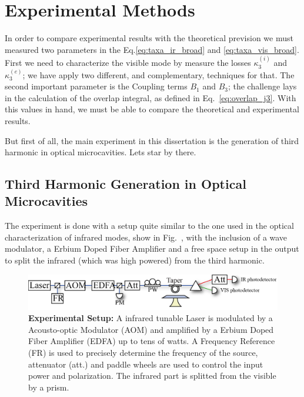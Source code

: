\chapter{Experimental Methods}
\label{chap:6_experiments}
In order to compare experimental results with the theoretical prevision we must measured two parameters in the Eq.\ref{eq:taxa_ir_broad} and \ref{eq:taxa_vis_broad}. First we need to characterize the visible mode by measure the losses $\kappa^{(i)}_3$ and $\kappa^{(e)}_3$; we have apply two different, and complementary, techniques for that. The second important parameter is the Coupling terms $B_1$ and $B_3$; the challenge lays in the calculation of the overlap integral, as defined in Eq.~\ref{eq:overlap_j3}. With this values in hand, we must be able to compare the theoretical and experimental results. 

But first of all, the main experiment in this dissertation is the generation of third harmonic in optical microcavities. Lets star by there. %

\section{Third Harmonic Generation in Optical Microcavities}

The experiment is done with a setup quite similar to the one used in the optical characterization of infrared modes, show in Fig.~, with the inclusion of a wave modulator, a Erbium Doped Fiber Amplifier and a free space setup in the output to split the infrared (which was high powered) from the third harmonic.
\begin{figure}[h!]
    \centering
    \includegraphics[width = 16 cm]{figuras/Dissertation_thg_setup.jpg}
    \caption{\textbf{Experimental Setup:} A infrared tunable Laser is modulated by a Acousto-optic Modulator (AOM) and amplified by a Erbium Doped Fiber Amplifier (EDFA) up to tens of watts. A Frequency Reference (FR) is used to precisely determine the frequency of the source, attenuator (att.) and paddle wheels are used to control the input power and polarization. The infrared part is splitted from the visible by a prism.}
    \label{fig:thg_setup}
\end{figure}

